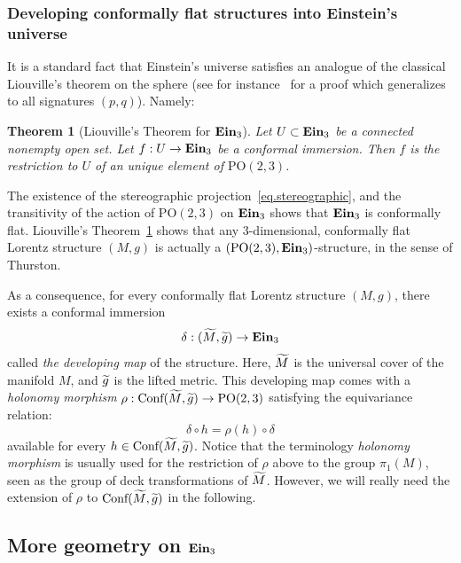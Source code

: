 \documentclass[11pt]{article}
\newtheorem{theo}{Theorem}[section]
\theoremstyle{definition}
\numberwithin{equation}{section}
\numberwithin{figure}{section}
\numberwithin{table}{section}
\DeclareMathOperator{\ein}{{\bf Ein}_3}
\newcommand{\tm}{\tilde{{M}}}
\let\oldtilde\tilde
\renewcommand*\tilde[1]{\mathchoice{\widetilde{#1}}{\widetilde{#1}}{\widetilde{#1}}{\oldtilde{#1}}}
\begin{document}
\subsubsection{Developing conformally flat structures into Einstein's universe}\label{sec.developing}
It is a standard fact that Einstein's universe satisfies an analogue of the classical Liouville's theorem on the sphere (see for instance~\cite[Chapter~7, Corollary~3.5]{sharpe} for a proof which generalizes to all signatures $(p,q)$). Namely:

\begin{theo}[Liouville's Theorem for $\ein$]\label{th.liouville}
Let $U \subset \ein$ be a connected nonempty open set. Let $f: U \to \ein$ be a conformal immersion. Then $f$ is the restriction to $U$ of an unique element of $\mbox{PO}(2,3)$.
\end{theo}

The existence of the stereographic projection~\eqref{eq.stereographic}, and the transitivity of the action of $\mbox{PO}(2,3)$ on $\ein$ shows that $\ein$ is conformally flat. Liouville's Theorem~\ref{th.liouville} shows that any $3$-dimensional, conformally flat Lorentz structure $(M,g)$ is actually a $(\mbox{PO}(2,3),\ein)$-structure, in the sense of Thurston.

As a consequence, for every conformally flat Lorentz structure $(M,g)$, there exists a conformal immersion
\[
\delta: (\tm,\tilde{g}) \to \ein
\]
called \emph{the developing map} of the structure. Here, $\tm$ is the universal cover of the manifold $M$, and $\tilde{g}$ is the lifted metric. This developing map comes with a \emph{holonomy morphism} $\rho: {\mbox{Conf}(\tm,\tilde{g})} \to \mbox{PO}(2,3)$ satisfying the equivariance relation:
\begin{equation}\label{eq.equiholonomy}
\delta \circ h = \rho(h) \circ \delta
\end{equation}
available for every $h \in {\mbox{Conf}(\tm,\tilde{g})}$. Notice that the terminology \emph{holonomy morphism} is usually used for the restriction of $\rho$ above to the group $\pi_1(M)$, seen as the group of deck transformations of $\tilde{M}$. However, we will really need the extension of $\rho $ to ${\mbox{Conf}(\tm,\tilde{g})}$ in the following.



\subsection{More geometry on \texorpdfstring{$\ein$}{ein}}\label{sec.more.geometry}
\end{document}
